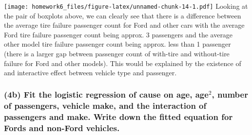 \documentclass[
]{article}
\begin{document}
\texttt{[image: homework6\_files/figure-latex/unnamed-chunk-14-1.pdf]}
Looking at the pair of boxplots above, we can clearly see that there is
a difference between the average tire failure passenger count for Ford
and other cars with the average Ford tire failure passenger count being
approx. 3 passengers and the average other model tire failure passenger
count being approx. less than 1 passenger (there is a larger gap between
passenger count of with-tire and without-tire failure for Ford and other
models). This would be explained by the existence of and interactive
effect between vehicle type and passenger.

\hypertarget{b-fit-the-logistic-regression-of-cause-on-age-age2-number-of-passengers-vehicle-make-and-the-interaction-of-passengers-and-make.-write-down-the-fitted-equation-for-fords-and-non-ford-vehicles.}{%
\subsubsection{\texorpdfstring{(4b) Fit the logistic regression of cause
on age, age\(^2\), number of passengers, vehicle make, and the
interaction of passengers and make. Write down the fitted equation for
Fords and non-Ford
vehicles.}{(4b) Fit the logistic regression of cause on age, age\^{}2, number of passengers, vehicle make, and the interaction of passengers and make. Write down the fitted equation for Fords and non-Ford vehicles.}}\label{b-fit-the-logistic-regression-of-cause-on-age-age2-number-of-passengers-vehicle-make-and-the-interaction-of-passengers-and-make.-write-down-the-fitted-equation-for-fords-and-non-ford-vehicles.}}
\end{document}
